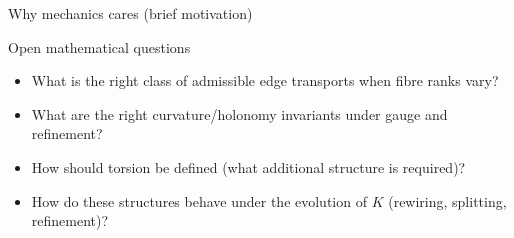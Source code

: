 \begin{frame}{Why mechanics cares (brief motivation)}
\begin{center}
\end{center}

\end{frame}

\begin{frame}{Open mathematical questions}
\begin{itemize}
\item What is the right class of admissible edge transports when fibre ranks vary?
\item What are the right curvature/holonomy invariants under gauge and refinement?
\item How should torsion be defined (what additional structure is required)?
\item How do these structures behave under the evolution of $K$ (rewiring, splitting, refinement)?
\end{itemize}
\end{frame}

